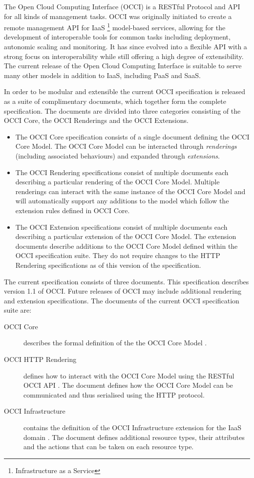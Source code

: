The Open Cloud Computing Interface (OCCI) is a RESTful Protocol and
API for all kinds of management tasks. OCCI was originally initiated
to create a remote management API for IaaS%
\footnote{Infrastructure as a Service}
model-based services, allowing for the development of interoperable tools for
common tasks including deployment, autonomic scaling and monitoring.
%
It has since evolved into a flexible API with a strong focus on
interoperability while still offering a high degree of extensibility. The
current release of the Open Cloud Computing Interface is suitable to serve many
other models in addition to IaaS, including PaaS and SaaS.

In order to be modular and extensible the current OCCI specification is
released as a suite of complimentary documents, which together form the complete
specification.
%
The documents are divided into three categories consisting of the OCCI Core,
the OCCI Renderings and the OCCI Extensions.
%
\begin{itemize}
\item The OCCI Core specification consists of a single document defining the
 OCCI Core Model. The OCCI Core Model can be interacted through {\em
 renderings} (including associated behaviours) and expanded through {\em extensions}.
\item The OCCI Rendering specifications consist of multiple documents each
 describing a particular rendering of the OCCI Core Model. Multiple renderings can
 interact with the same instance of the OCCI Core Model and will automatically support
 any additions to the model which follow the extension rules defined in OCCI
 Core.
\item The OCCI Extension specifications consist of multiple documents each
 describing a particular extension of the OCCI Core Model. The extension documents
 describe additions to the OCCI Core Model defined within the OCCI specification
 suite. They do not require changes to the HTTP Rendering specifications as of this version of the specification.
\end{itemize}
%
The current specification consists of three documents. This
specification describes version 1.1 of OCCI. Future releases of OCCI
may include additional rendering and extension specifications. The
documents of the current OCCI specification suite are:

\begin{description}
\item[OCCI Core] describes the formal definition of the the OCCI Core Model
\cite{occi:core}.
\item[OCCI HTTP Rendering] defines how to interact with the OCCI Core Model using the
RESTful OCCI API \cite{occi:http_rendering}. The document defines how the OCCI Core Model can
be communicated and thus serialised using the HTTP protocol.
\item[OCCI Infrastructure] contains the definition of the OCCI Infrastructure
extension for the IaaS domain \cite{occi:infrastructure}. The document defines
additional resource types, their attributes and the actions that can be taken
on each resource type.
\end{description}
